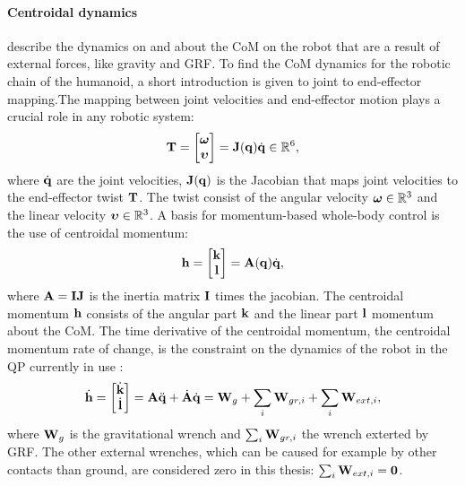 \paragraph{Centroidal dynamics} \cite{orin2013centroidal} describe the dynamics on and about the \ac{CoM} on the robot that are a result of external forces, like gravity and \ac{GRF}. To find the \ac{CoM} dynamics for the robotic chain of the humanoid, a short introduction is given to joint to end-effector mapping.The mapping between joint velocities and end-effector motion plays a crucial role in any robotic system:
\begin{equation}\label{eq:jacobian}
\mathbf{T}=\begin{bmatrix}\boldsymbol{\omega} \\ \boldsymbol{\upsilon} \end{bmatrix} = \mathbf{J}(\mathbf{q})\dot{\mathbf{q}} \in \mathbb{R}^6,
\end{equation}
where $\dot{\mathbf{q}}$ are the joint velocities, $\mathbf{J}(\mathbf{q})$ is the Jacobian that maps joint velocities to the end-effector twist $\mathbf{T}$. The twist consist of the angular velocity $\boldsymbol{\omega} \in \mathbb{R}^3$ and the linear velocity $\boldsymbol{\upsilon} \in \mathbb{R}^3$. A basis for momentum-based whole-body control is the use of centroidal momentum:
\begin{equation}
\mathbf{h}=\begin{bmatrix}\mathbf{k} \\ \mathbf{l} \end{bmatrix} =\mathbf{A}(\mathbf{q})\dot{\mathbf{q}},
\end{equation}
 where $\mathbf{A}=\mathbf{I}\mathbf{J}$ is the inertia matrix $\mathbf{I}$ times the jacobian. The centroidal momentum $\mathbf{h}$ consists of the angular part $\mathbf{k}$ and the linear part $\mathbf{l}$ momentum about the \ac{CoM}. The time derivative of the centroidal momentum, the centroidal momentum rate of change, is the constraint on the dynamics of the robot in the \ac{QP} currently in use \cite{koolen2016design}:
\begin{equation}
\dot{\mathbf{h}}=\begin{bmatrix}\dot{\mathbf{k}}\\ \dot{\mathbf{l}} \end{bmatrix} =\mathbf{A}\ddot{\mathbf{q}} +\dot{\mathbf{A}}\dot{\mathbf{q}} = \mathbf{W}_g + \sum_i\mathbf{W}_{gr,i} + \sum_i \mathbf{W}_{ext,i}, 
\end{equation}
where $\mathbf{W}_g$ is the gravitational wrench and $\sum_i\mathbf{W}_{gr,i}$ the wrench exterted by \ac{GRF}. The other external wrenches, which can be caused for example by other contacts than ground, are considered zero in this thesis: $\sum_i \mathbf{W}_{ext,i}=\mathbf{0}$.
